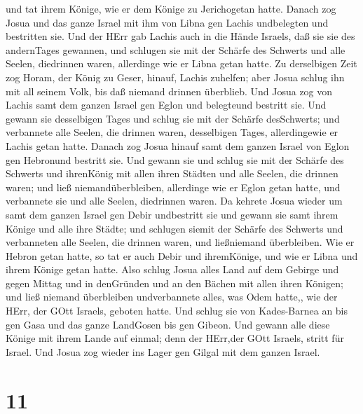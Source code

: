 und tat ihrem Könige, wie er dem Könige zu Jerichogetan hatte.
 Danach zog Josua und das ganze Israel mit ihm von Libna
gen Lachis undbelegten und bestritten sie.  Und der HErr
gab Lachis auch in die Hände Israels, daß sie sie des andernTages
gewannen, und schlugen sie mit der Schärfe des Schwerts und alle Seelen,
diedrinnen waren, allerdinge wie er Libna getan hatte.  Zu
derselbigen Zeit zog Horam, der König zu Geser, hinauf, Lachis zuhelfen;
aber Josua schlug ihn mit all seinem Volk, bis daß niemand drinnen
überblieb.  Und Josua zog von Lachis samt dem ganzen Israel
gen Eglon und belegteund bestritt sie.  Und gewann sie
desselbigen Tages und schlug sie mit der Schärfe desSchwerts; und
verbannete alle Seelen, die drinnen waren, desselbigen Tages,
allerdingewie er Lachis getan hatte.  Danach zog Josua
hinauf samt dem ganzen Israel von Eglon gen Hebronund bestritt sie.
 Und gewann sie und schlug sie mit der Schärfe des Schwerts
und ihrenKönig mit allen ihren Städten und alle Seelen, die drinnen
waren; und ließ niemandüberbleiben, allerdinge wie er Eglon getan hatte,
und verbannete sie und alle Seelen, diedrinnen waren.  Da
kehrete Josua wieder um samt dem ganzen Israel gen Debir undbestritt sie
 und gewann sie samt ihrem Könige und alle ihre Städte; und
schlugen siemit der Schärfe des Schwerts und verbanneten alle Seelen,
die drinnen waren, und ließniemand überbleiben. Wie er Hebron getan
hatte, so tat er auch Debir und ihremKönige, und wie er Libna und ihrem
Könige getan hatte.  Also schlug Josua alles Land auf dem
Gebirge und gegen Mittag und in denGründen und an den Bächen mit allen
ihren Königen; und ließ niemand überbleiben undverbannete alles, was
Odem hatte,, wie der HErr, der GOtt Israels, geboten hatte.
 Und schlug sie von Kades-Barnea an bis gen Gasa und das
ganze LandGosen bis gen Gibeon.  Und gewann alle diese
Könige mit ihrem Lande auf einmal; denn der HErr,der GOtt Israels,
stritt für Israel.  Und Josua zog wieder ins Lager gen
Gilgal mit dem ganzen Israel.

\hypertarget{section-10}{%
\section{11}\label{section-10}}

